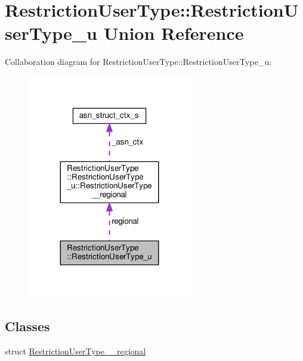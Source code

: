 \hypertarget{unionRestrictionUserType_1_1RestrictionUserType__u}{}\section{Restriction\+User\+Type\+:\+:Restriction\+User\+Type\+\_\+u Union Reference}
\label{unionRestrictionUserType_1_1RestrictionUserType__u}


Collaboration diagram for Restriction\+User\+Type\+:\+:Restriction\+User\+Type\+\_\+u\+:\nopagebreak
\begin{figure}[H]
\begin{center}
\leavevmode
\includegraphics[width=203pt]{unionRestrictionUserType_1_1RestrictionUserType__u__coll__graph}
\end{center}
\end{figure}
\subsection*{Classes}
\begin{DoxyCompactItemize}
\item 
struct \hyperlink{structRestrictionUserType_1_1RestrictionUserType__u_1_1RestrictionUserType____regional}{Restriction\+User\+Type\+\_\+\+\_\+regional}
\end{DoxyCompactItemize}

